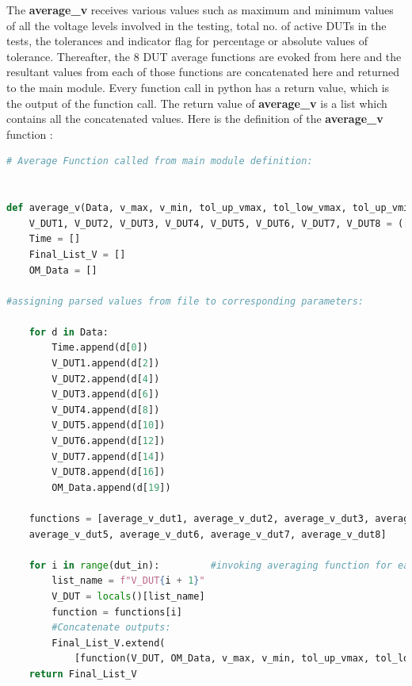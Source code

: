 The \textbf{average\_v} receives various values such as maximum and minimum values of all the voltage levels involved in the testing, total no. of active DUTs in the tests, the tolerances and indicator flag for percentage or absolute values of tolerance. Thereafter, the 8 DUT average functions are evoked from here and the resultant values from each of those functions are concatenated here and returned to the main module. Every function call in python has a return value, which is the output of the function call. The return value of \textbf{average\_v} is a list which contains all the concatenated values. Here is the definition of the \textbf{average\_v} function : \\

\begin{lstlisting}[language = Python]
# Average Function called from main module definition:
 
 
def average_v(Data, v_max, v_min, tol_up_vmax, tol_low_vmax, tol_up_vmin, tol_low_vmin, dut_in, perc):
    V_DUT1, V_DUT2, V_DUT3, V_DUT4, V_DUT5, V_DUT6, V_DUT7, V_DUT8 = ([] for i in range(8))
    Time = []
    Final_List_V = []
    OM_Data = []

#assigning parsed values from file to corresponding parameters:

    for d in Data:    
        Time.append(d[0])
        V_DUT1.append(d[2])
        V_DUT2.append(d[4])
        V_DUT3.append(d[6])
        V_DUT4.append(d[8])
        V_DUT5.append(d[10])
        V_DUT6.append(d[12])
        V_DUT7.append(d[14])
        V_DUT8.append(d[16])
        OM_Data.append(d[19])
 
    functions = [average_v_dut1, average_v_dut2, average_v_dut3, average_v_dut4, 
    average_v_dut5, average_v_dut6, average_v_dut7, average_v_dut8]
 
    for i in range(dut_in):         #invoking averaging function for each DUTs 
        list_name = f"V_DUT{i + 1}"
        V_DUT = locals()[list_name]
        function = functions[i]
        #Concatenate outputs:
        Final_List_V.extend(
            [function(V_DUT, OM_Data, v_max, v_min, tol_up_vmax, tol_low_vmax, tol_up_vmin, tol_low_vmin, Time, perc)])    
    return Final_List_V    
\end{lstlisting}

